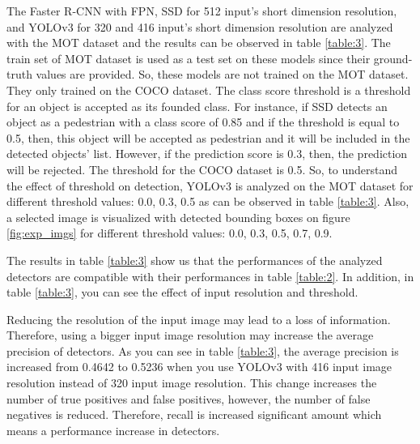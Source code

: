 \documentclass{article}
\begin{document}
\setlength{\parindent}{6ex}

\indent

The Faster R-CNN with FPN, SSD for 512 input's short dimension resolution, and YOLOv3 for 320 and 416 
input's short dimension resolution are analyzed with the MOT dataset and the results can be observed 
in table \ref{table:3}. The train set of MOT dataset is used as a test set on these models since 
their ground-truth values are provided. So, these models are not trained on the MOT dataset. 
They only trained on the COCO dataset. The class score threshold is a threshold for an object 
is accepted as its founded class. For instance, if SSD detects an object as a pedestrian 
with a class score of 0.85 and if the threshold is equal to 0.5, then, this object will be 
accepted as pedestrian and it will be included in the detected objects' list. However, if 
the prediction score is 0.3, then, the prediction will be rejected. The threshold for 
the COCO dataset is 0.5. So, to understand the effect of threshold on detection, YOLOv3 is 
analyzed on the MOT dataset for different threshold values: 0.0, 0.3, 0.5 as can be observed 
in table \ref{table:3}. Also, a selected image is visualized with detected bounding boxes 
on figure \ref{fig:exp_imgs} for different threshold values: 0.0, 0.3, 0.5, 0.7, 0.9. \par

The results in table \ref{table:3} show us that the performances of the analyzed detectors 
are compatible with their performances in table \ref{table:2}. In addition, in table \ref{table:3}, 
you can see the effect of input resolution and threshold. \par 

Reducing the resolution of the input image may lead to a loss of information. Therefore, using a bigger input 
image resolution may increase the average precision of detectors. As you can see in table \ref{table:3}, 
the average precision is increased from 0.4642 to 0.5236 when you use YOLOv3 with 416 input image 
resolution instead of 320 input image resolution. This change increases the number of true positives and 
false positives, however, the number of false negatives is reduced. Therefore, recall is increased 
significant amount which means a performance increase in detectors. \par
\end{document}

